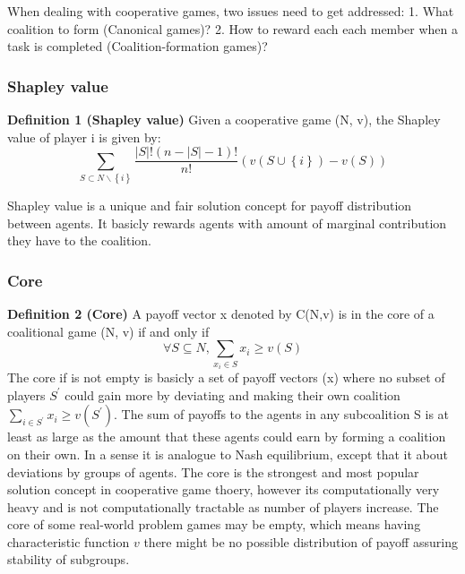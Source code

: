 \documentclass[10pt, conference, compsocconf]{IEEEtran}
\theoremstyle{plain}
\theoremstyle{definition}
\begin{document}
When dealing with cooperative games, two issues need to get addressed: 1. What coalition to form (Canonical games)? 2. How to reward each each member when a task is completed (Coalition-formation games)?

\subsubsection{Shapley value}

{\bf Definition 1 (Shapley value)} Given a cooperative game (N, v), the Shapley value of player i is given by\cite{shapley_value}: 
\begin{equation}\label{eq:shapley}
\sum_{S \subset N \backslash \left\{i\right\} } \frac{|S|! (n-|S|-1)!}{n!} (v(S \cup \left\{i\right\}) - v(S))
\end{equation}

Shapley value is a unique and fair solution concept for payoff distribution between agents. It basicly rewards agents with amount of marginal contribution they have to the coalition.

\subsubsection{Core}

{\bf Definition 2 (Core)} A payoff vector x denoted by C(N,v) is in the core of a coalitional game (N, v) if and only if
\begin{equation}\label{eq:core}
\forall S \subseteq N, \sum_{x_i \in S} x_i \geq v(S)
\end{equation}
The core if is not empty is basicly a set of payoff vectors (x) where no subset of players $S^\prime$ could gain more by deviating and making their own coalition $\sum_{i \in S^\prime} x_i \geq v(S^\prime)$. The sum of payoffs to the agents in any subcoalition S is at least as large as the amount that these agents could earn by forming a coalition on their own. In a sense it is analogue to Nash equilibrium, except that it about deviations by groups of agents. The core is the strongest and most popular solution concept in cooperative game thoery, however its computationally very heavy and is not computationally tractable as number of players increase. The core of some real-world problem games may be empty, which means having characteristic function $v$ there might be no possible distribution of payoff assuring stability of subgroups.
\end{document}
